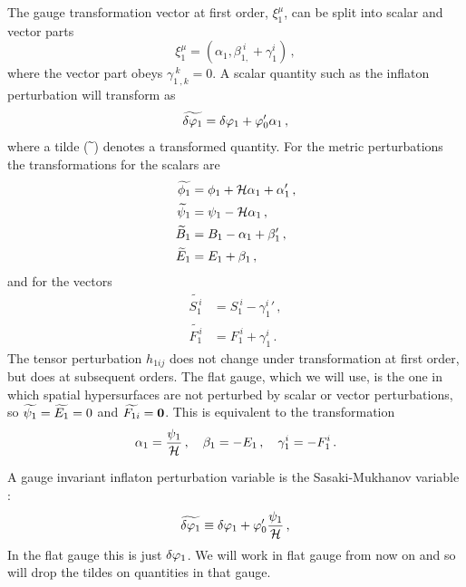The gauge transformation vector at first order,  $\xi_1^\mu$, can be split into
scalar
and vector parts
% 
\begin{equation}
\label{eq:xidefn-intro}
 \xi_1^\mu = (\alpha_1, \beta_{1,}^{~i} + \gamma_1^i)\,,
\end{equation}
% 
where the vector part obeys $\gamma_{1~,k}^{~k}=0$. A scalar quantity such as
the inflaton perturbation will transform as \cite{Malik:2008im, Malik:2008yp}
% 
\begin{equation}
 \label{eq:dphitransform-intro}
 \widetilde{\delta\varphi_{1}} = \delta\varphi_{1} + \varphi_0' \alpha_1\,,
\end{equation}
where a tilde ($\widetilde{~}$) denotes a transformed quantity. For the metric
perturbations the
transformations for the scalars are
\begin{align}
 \label{transphi1}
\widetilde {\phi_1} &= \phi_1 +\H\alpha_1+\alpha_1'\,,\\
%
\label{transpsi1}
\widetilde \psi_1 &= \psi_1-\H\alpha_1 \,,\\
%
\label{transB1}
\widetilde B_1 &= B_1-\alpha_1+\beta_1'\,,\\
%
\label{transE1}
\widetilde E_1 &= E_1+\beta_1\,,
\end{align}
and for the vectors
\begin{align}
 \label{transS1}
\widetilde {S_{1}^{~i}} &= S_{1}^{~i}-{\gamma_1^i}'\,, \\
%
\label{transF1}
\widetilde {F_{1}^{~i}} &= F_{1}^{~i}+\gamma_1^i\,. 
\end{align}
% 
The tensor perturbation $h_{1ij}$ does not change under transformation at first
order, but does at subsequent orders.
The flat gauge, which we will use, is the one in which spatial hypersurfaces
are not perturbed by scalar or vector perturbations, so $\widetilde{\psi_1} = \widetilde{E_1}
=0$ and $\widetilde{F_{1i}} = \textbf{0}$.  This is equivalent to the transformation
% 
\begin{equation}
 \alpha_1 = \frac{\psi_1}{\mathcal{H}}\,,\quad \beta_1=-E_1 \,, \quad \gamma^i_1 =
-F^i_1\,.
\end{equation}

A gauge invariant inflaton perturbation variable is the Sasaki-Mukhanov
variable \cite{Mukhanov:1990me, Mukhanov:1988jd,
Sasaki:1986hm}:
% 
\begin{equation}
\label{eq:flatdvp1-intro}
 \widetilde{\delta\varphi_{1}} \equiv \delta\varphi_{1} + \varphi_0'\frac{\psi_1}{\mathcal{H}}\,,
\end{equation}
% 
In the flat gauge this is just $\delta\varphi_{1}$. We will work in flat
gauge from now on and so will drop the tildes on quantities in that gauge.

